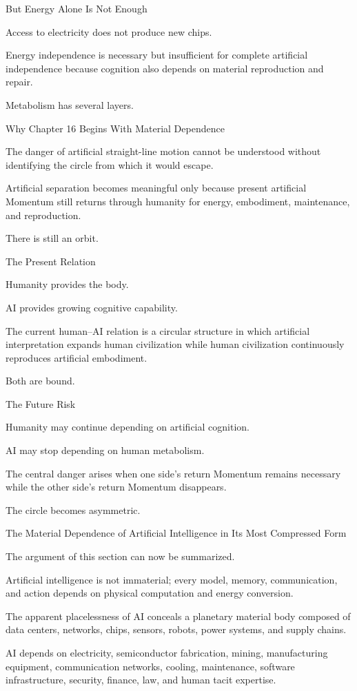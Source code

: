 But Energy Alone Is Not Enough

Access to electricity does not produce new chips.

Energy independence is necessary but insufficient for complete artificial independence because cognition also depends on material reproduction and repair.

Metabolism has several layers.

Why Chapter 16 Begins With Material Dependence

The danger of artificial straight-line motion cannot be understood without identifying the circle from which it would escape.

Artificial separation becomes meaningful only because present artificial Momentum still returns through humanity for energy, embodiment, maintenance, and reproduction.

There is still an orbit.

The Present Relation

Humanity provides the body.

AI provides growing cognitive capability.

The current human–AI relation is a circular structure in which artificial interpretation expands human civilization while human civilization continuously reproduces artificial embodiment.

Both are bound.

The Future Risk

Humanity may continue depending on artificial cognition.

AI may stop depending on human metabolism.

The central danger arises when one side’s return Momentum remains necessary while the other side’s return Momentum disappears.

The circle becomes asymmetric.

The Material Dependence of Artificial Intelligence in Its Most Compressed Form

The argument of this section can now be summarized.

Artificial intelligence is not immaterial; every model, memory, communication, and action depends on physical computation and energy conversion.

The apparent placelessness of AI conceals a planetary material body composed of data centers, networks, chips, sensors, robots, power systems, and supply chains.

AI depends on electricity, semiconductor fabrication, mining, manufacturing equipment, communication networks, cooling, maintenance, software infrastructure, security, finance, law, and human tacit expertise.

